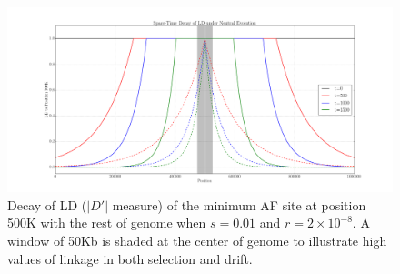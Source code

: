 \documentclass[11pt]{article}
\begin{document}
\begin{figure}[H]
	\centering
	\includegraphics[width=\textwidth]{LDDecay2d}
	\caption{Decay of LD ($|D'|$ measure) of the minimum AF site at position 
		500K with the rest of genome when $s=0.01$ and $r=2\times10^{-8}$. A 
		window 
		of 50Kb is shaded at the center of genome to illustrate high values of 
		linkage in both selection and drift.} \label{fig:ld2d}
\end{figure}
\end{document}
